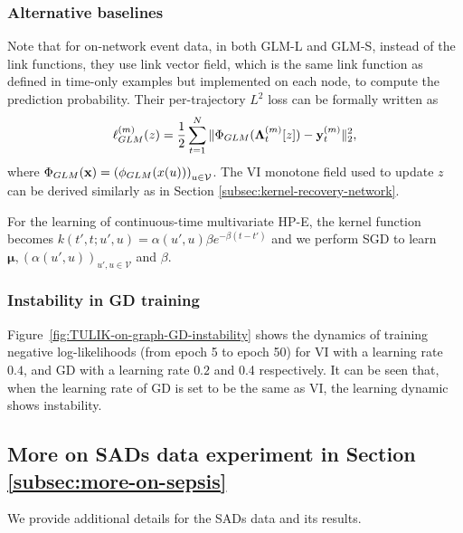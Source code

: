 \documentclass[11pt]{article}
\theoremstyle{remark}
\theoremstyle{plain}
\newcommand{\calV}{\mathcal{V}}
\begin{document}
\subsubsection{Alternative baselines}\label{apdx:detail-baselines-on-network}
Note that for on-network event data, in both GLM-L and GLM-S, instead of the link functions, they use link vector field, which is the same link function as defined in time-only examples but implemented on each node, to compute the prediction probability. 
%
Their per-trajectory $L^2$ loss can be formally written as
\[
\ell_{\rm GLM}^{(m)}( z )
  = \frac{1}{2 }\sum_{t=1}^N  \| \Phi_{\rm GLM}( \mathbf{\Lambda}_t^{(m)}[z] ) - \mathbf{y}_t^{(m)} \|_2^2,
\]
where $\Phi_{\rm GLM}(\mathbf {x}) = \left(\phi_{\rm GLM}(x(u))\right)_{u\in\calV} $. 
The VI monotone field used to update $z$ can be derived similarly as in Section \ref{subsec:kernel-recovery-network}.

For the learning of continuous-time multivariate HP-E, the kernel function becomes $k(t',t;u',u) = \alpha(u',u)\beta e^{-\beta(t-t')}$ and we perform SGD to learn $\boldsymbol{\mu}, (\alpha(u',u))_{u',u\in\calV}$ and $\beta$. 


\subsubsection{Instability in GD training}\label{apdx:GD-instability}


Figure~\ref{fig:TULIK-on-graph-GD-instability} shows the dynamics of training negative log-likelihoods 
(from epoch 5 to epoch 50)
for VI with a learning rate $0.4$,
and GD with a learning rate $0.2$ and 0.4 respectively. 
It can be seen that, when the learning rate of GD is set to be the same as VI, the learning dynamic shows instability. 






\subsection{More on SADs data experiment in Section \ref{subsec:more-on-sepsis}}\label{apdx:SADs}

We provide additional details for the SADs data and its results. 
\end{document}
